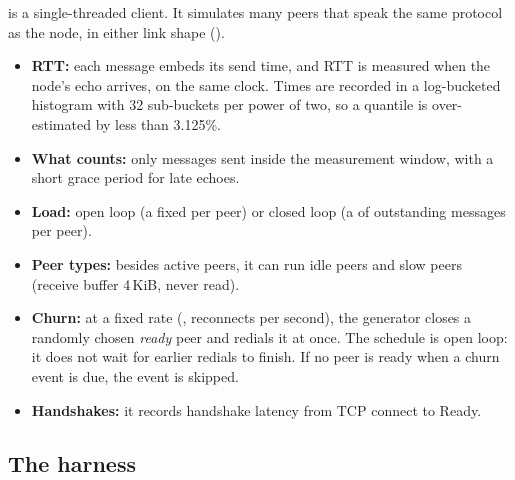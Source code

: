  is a single-threaded  client. It simulates many peers that
speak the same protocol as the node, in either link shape ().
\begin{itemize}
  \item \textbf{RTT:} each message embeds its send time, and RTT is measured when the
        node's echo arrives, on the same clock. Times are recorded in a log-bucketed
        histogram with 32 sub-buckets per power of two, so a quantile is
        over-estimated by less than 3.125\%.
  \item \textbf{What counts:} only messages sent inside the measurement window, with
        a short grace period for late echoes.
  \item \textbf{Load:} open loop (a fixed  per peer) or closed loop (a
         of outstanding messages per peer).
  \item \textbf{Peer types:} besides active peers, it can run idle peers and slow
        peers (receive buffer 4\,KiB, never read).
  \item \textbf{Churn:} at a fixed rate (, reconnects per second), the
        generator closes a randomly chosen \emph{ready} peer and redials it at once.
        The schedule is open loop: it does not wait for earlier redials to finish. If
        no peer is ready when a churn event is due, the event is skipped.
  \item \textbf{Handshakes:} it records handshake latency from TCP connect to Ready.
\end{itemize}

\subsection{The harness}

